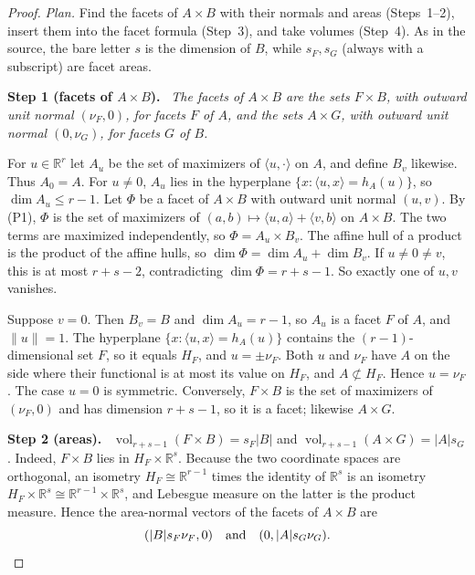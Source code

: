 \documentclass[11pt]{article}
\newcommand{\R}{\mathbb R}
\DeclareMathOperator{\vol}{vol}
\newcommand{\step}[1]{\par\smallskip\noindent\textbf{#1}\ }
\begin{document}
\begin{proof}
\emph{Plan.} Find the facets of \(A\times B\) with their normals and areas
(Steps~1--2), insert them into the facet formula (Step~3), and take volumes
(Step~4). As in the source, the bare letter \(s\) is the dimension of
\(B\), while \(s_F,s_G\) (always with a subscript) are facet areas.

\step{Step 1 (facets of \(A\times B\)).} \emph{The facets of \(A\times B\)
are the sets \(F\times B\), with outward unit normal \((\nu_F,0)\), for
facets \(F\) of \(A\), and the sets \(A\times G\), with outward unit normal
\((0,\nu_G)\), for facets \(G\) of \(B\).}

For \(u\in\R^r\) let \(A_u\) be the set of maximizers of
\(\langle u,\cdot\rangle\) on \(A\), and define \(B_v\) likewise. Thus
\(A_0=A\). For \(u\ne0\), \(A_u\) lies in the hyperplane
\(\{x:\langle u,x\rangle=h_A(u)\}\), so \(\dim A_u\le r-1\). Let \(\Phi\)
be a facet of \(A\times B\) with outward unit normal \((u,v)\). By (P1),
\(\Phi\) is the set of maximizers of
\((a,b)\mapsto\langle u,a\rangle+\langle v,b\rangle\) on \(A\times B\). The
two terms are maximized independently, so \(\Phi=A_u\times B_v\). The
affine hull of a product is the product of the affine hulls, so
\(\dim\Phi=\dim A_u+\dim B_v\). If \(u\ne0\ne v\), this is at most
\(r+s-2\), contradicting \(\dim\Phi=r+s-1\). So exactly one of \(u,v\)
vanishes.

Suppose \(v=0\). Then \(B_v=B\) and \(\dim A_u=r-1\), so \(A_u\) is a facet
\(F\) of \(A\), and \(\|u\|=1\). The hyperplane
\(\{x:\langle u,x\rangle=h_A(u)\}\) contains the \((r-1)\)-dimensional set
\(F\), so it equals \(H_F\), and \(u=\pm\nu_F\). Both \(u\) and \(\nu_F\)
have \(A\) on the side where their functional is at most its value on
\(H_F\), and \(A\not\subset H_F\). Hence \(u=\nu_F\). The case \(u=0\) is
symmetric. Conversely, \(F\times B\) is the set of maximizers of
\((\nu_F,0)\) and has dimension \(r+s-1\), so it is a facet; likewise
\(A\times G\).

\step{Step 2 (areas).}
\(\vol_{r+s-1}(F\times B)=s_F|B|\) and \(\vol_{r+s-1}(A\times G)=|A|s_G\).
Indeed, \(F\times B\) lies in \(H_F\times\R^s\). Because the two coordinate
spaces are orthogonal, an isometry \(H_F\cong\R^{r-1}\) times the identity
of \(\R^s\) is an isometry \(H_F\times\R^s\cong\R^{r-1}\times\R^s\), and
Lebesgue measure on the latter is the product measure. Hence the
area-normal vectors of the facets of \(A\times B\) are
\[
 (|B|s_F\nu_F,0)
 \quad\hbox{and}\quad
 (0,|A|s_G\nu_G).
\]


\end{proof}
\end{document}
